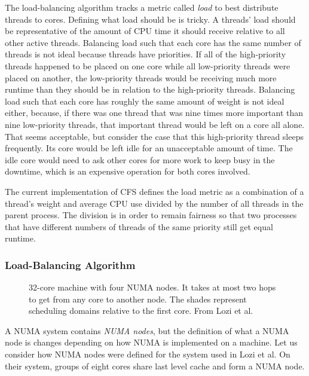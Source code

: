 \documentclass{sig-alternate}
\begin{document}
The load-balancing algorithm tracks a metric called \emph{load} to best distribute threads to cores. Defining what load should be is tricky. A threads' load should be representative of the amount of CPU time it should receive relative to all other active threads. Balancing load such that each core has the same number of threads is not ideal because threads have priorities. If all of the high-priority threads happened to be placed on one core while all low-priority threads were placed on another, the low-priority threads would be receiving much more runtime than they should be in relation to the high-priority threads. Balancing load such that each core has roughly the same amount of weight is not ideal either, because, if there was one thread that was nine times more important than nine low-priority threads, that important thread would be left on a core all alone. That seems acceptable, but consider the case that this high-priority thread sleeps frequently. Its core would be left idle for an unacceptable amount of time. The idle core would need to ask other cores for more work to keep busy in the downtime, which is an expensive operation for both cores involved.~\cite{Lozi:2016}

The current implementation of CFS defines the load metric as a combination of a thread's weight and average CPU use divided by the number of all threads in the parent process. The division is in order to remain fairness so that two processes that have different numbers of threads of the same priority still get equal runtime.~\cite{Lozi:2016}

\subsubsection{Load-Balancing Algorithm}
\label{sec:loadbalancealg}

\begin{figure}
\centering
{}
\caption{32-core machine with four NUMA nodes. It takes at most two hops to get from any core to another node. The shades represent scheduling domains relative to the first core. From Lozi et al.~\cite{Lozi:2016}}
\label{fig:domains}
\end{figure}

A NUMA system contains \emph{NUMA nodes}, but the definition of what a NUMA node is changes depending on how NUMA is implemented on a machine. Let us consider how NUMA nodes were defined for the system used in Lozi et al. On their system, groups of eight cores share last level cache and form a NUMA node.
\end{document}
